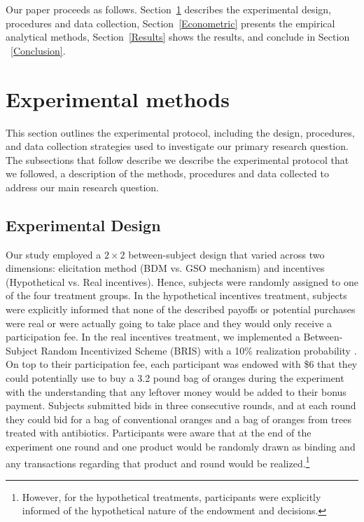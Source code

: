 \documentclass[12pt]{article}
\begin{document}
Our paper proceeds as follows. Section~\ref{Experiment} describes the experimental design, procedures and data collection, Section~\ref{Econometric} presents the empirical analytical methods, Section~\ref{Results} shows the results, and conclude in Section ~\ref{Conclusion}.

\section{Experimental methods}
\label{Experiment}
This section outlines the experimental protocol, including the design, procedures, and data collection strategies used to investigate our primary research question. The subsections that follow describe we describe the experimental protocol that we followed, a description of the methods, procedures and data collected to address our main research question. 

\subsection{Experimental Design}
Our study employed a $2\times2$ between-subject design that varied across two dimensions: elicitation method (BDM vs. GSO mechanism) and incentives (Hypothetical vs. Real incentives). Hence, subjects were randomly assigned to one of the four treatment groups. In the hypothetical incentives treatment, subjects were explicitly informed that none of the described payoffs or potential purchases were real or were actually going to take place and they would only receive a participation fee. In the real incentives treatment, we implemented a Between-Subject Random Incentivized Scheme (BRIS) with a 10\% realization probability \citep{ahles_testing_2024}. On top to their participation fee, each participant was endowed with \$6 that they could potentially use to buy a 3.2 pound bag of oranges during the experiment with the understanding that any leftover money would be added to their bonus payment. Subjects submitted bids in three consecutive rounds, and at each round they could bid for a bag of conventional oranges and a bag of oranges from trees treated with antibiotics. Participants were aware that at the end of the experiment one round and one product would be randomly drawn as binding and any transactions regarding that product and round would be realized.\footnote{ However, for the hypothetical treatments, participants were explicitly informed of the hypothetical nature of the endowment and decisions.}  
\end{document}
